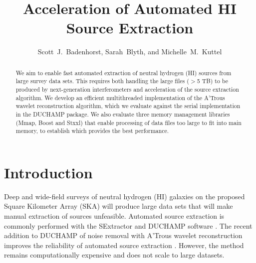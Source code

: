 
\resetcounters





\title{Acceleration of Automated HI Source Extraction} 

\author{Scott~J.~Badenhorst, Sarah~Blyth, and Michelle~M.~Kuttel
}


\begin{abstract}
We aim to enable fast automated extraction of neutral hydrogen (HI)  sources from large survey data sets. 
This requires both handling the large files ($>$5 TB) to be produced by next-generation interferometers and acceleration of  the source extraction algorithm.  We develop an efficient multithreaded implementation of the A'Trous wavelet reconstruction algorithm, which we evaluate against the serial implementation in the DUCHAMP package.  We also evaluate three memory management libraries (Mmap, Boost and Stxxl) that enable processing of data files too large to fit into main memory, to establish which provides the best performance. 
\end{abstract}

\section{Introduction}

Deep and wide-field surveys of neutral hydrogen (HI) galaxies on the proposed Square Kilometer Array (SKA) will produce large data sets that will make manual extraction of sources unfeasible.  Automated source extraction is commonly performed with the SExtractor \citep{Bertin1996} and DUCHAMP software \citep{Whiting2012}.   The recent addition to DUCHAMP of  noise removal with A'Trous wavelet reconstruction \citep{West2010} improves the reliability of automated source extraction \citep{Popping2012, Whiting2012}. However, the method remains computationally expensive and does not scale to large datasets.  


